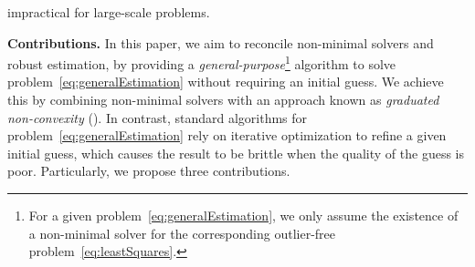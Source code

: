   impractical for large-scale problems.


{\bf Contributions.} In this paper, we aim to reconcile non-minimal solvers and robust estimation, by providing a 
\textit{general-purpose}\footnote{For a given problem~\eqref{eq:generalEstimation}, we only assume the existence of a non-minimal solver for the 
corresponding outlier-free problem~\eqref{eq:leastSquares}.} algorithm to solve problem~\eqref{eq:generalEstimation} without requiring an initial guess. 
We achieve this by combining  non-minimal solvers with an approach known as \emph{graduated non-convexity} (\GNC). 
In contrast, standard algorithms for problem~\eqref{eq:generalEstimation} rely on iterative optimization to refine a given initial guess, which causes the result to be brittle when the quality of the  guess is poor. 
Particularly, we propose three contributions.

